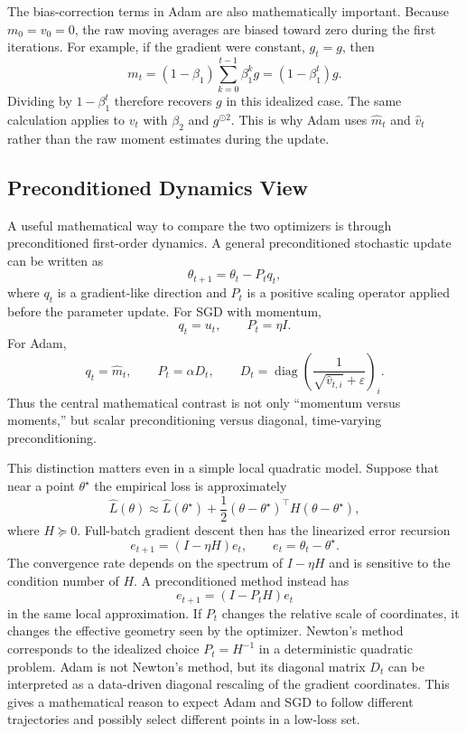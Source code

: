 \documentclass[11pt]{article}
\begin{document}
The bias-correction terms in Adam are also mathematically important. Because $m_0=v_0=0$, the raw moving averages are biased toward zero during the first iterations. For example, if the gradient were constant, $g_t=g$, then
\[
m_t
= (1-\beta_1)\sum_{k=0}^{t-1}\beta_1^k g
= (1-\beta_1^t)g.
\]
Dividing by $1-\beta_1^t$ therefore recovers $g$ in this idealized case. The same calculation applies to $v_t$ with $\beta_2$ and $g^{\odot 2}$. This is why Adam uses $\hat m_t$ and $\hat v_t$ rather than the raw moment estimates during the update.

\subsection{Preconditioned Dynamics View}

A useful mathematical way to compare the two optimizers is through preconditioned first-order dynamics. A general preconditioned stochastic update can be written as
\[
\theta_{t+1}
=
\theta_t - P_t q_t,
\]
where $q_t$ is a gradient-like direction and $P_t$ is a positive scaling operator applied before the parameter update. For SGD with momentum,
\[
q_t=u_t,\qquad P_t=\eta I.
\]
For Adam,
\[
q_t=\hat m_t,\qquad
P_t=\alpha D_t,
\qquad
D_t=\operatorname{diag}\left(\frac{1}{\sqrt{\hat v_{t,i}}+\varepsilon}\right)_i.
\]
Thus the central mathematical contrast is not only ``momentum versus moments,'' but scalar preconditioning versus diagonal, time-varying preconditioning.

This distinction matters even in a simple local quadratic model. Suppose that near a point $\theta^\star$ the empirical loss is approximately
\[
\widehat L(\theta)
\approx
\widehat L(\theta^\star)
+
\frac{1}{2}(\theta-\theta^\star)^\top H(\theta-\theta^\star),
\]
where $H\succeq 0$. Full-batch gradient descent then has the linearized error recursion
\[
e_{t+1}
=
(I-\eta H)e_t,
\qquad
e_t=\theta_t-\theta^\star.
\]
The convergence rate depends on the spectrum of $I-\eta H$ and is sensitive to the condition number of $H$. A preconditioned method instead has
\[
e_{t+1}
=
(I-P_tH)e_t
\]
in the same local approximation. If $P_t$ changes the relative scale of coordinates, it changes the effective geometry seen by the optimizer. Newton's method corresponds to the idealized choice $P_t=H^{-1}$ in a deterministic quadratic problem. Adam is not Newton's method, but its diagonal matrix $D_t$ can be interpreted as a data-driven diagonal rescaling of the gradient coordinates. This gives a mathematical reason to expect Adam and SGD to follow different trajectories and possibly select different points in a low-loss set.
\end{document}
